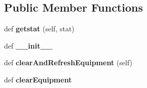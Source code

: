 \subsection*{Public Member Functions}
\begin{DoxyCompactItemize}
\item 
\hypertarget{classplayer__input_1_1_player_object_a3ac93a16bb5a9bf271708b4af0c37f46}{}def {\bfseries getstat} (self, stat)\label{classplayer__input_1_1_player_object_a3ac93a16bb5a9bf271708b4af0c37f46}

\item 
\hypertarget{classplayer__input_1_1_player_object_a5009b71c27443800e669f120a7f613ab}{}def {\bfseries \+\_\+\+\_\+init\+\_\+\+\_\+}\label{classplayer__input_1_1_player_object_a5009b71c27443800e669f120a7f613ab}

\item 
\hypertarget{classplayer__input_1_1_player_object_a3e0419bbc644af3e32f088836b077eb6}{}def {\bfseries clear\+And\+Refresh\+Equipment} (self)\label{classplayer__input_1_1_player_object_a3e0419bbc644af3e32f088836b077eb6}

\item 
\hypertarget{classplayer__input_1_1_player_object_a5324ff40d74da03b249763af0333ad40}{}def {\bfseries clear\+Equipment}\label{classplayer__input_1_1_player_object_a5324ff40d74da03b249763af0333ad40}


\end{DoxyCompactItemize}
